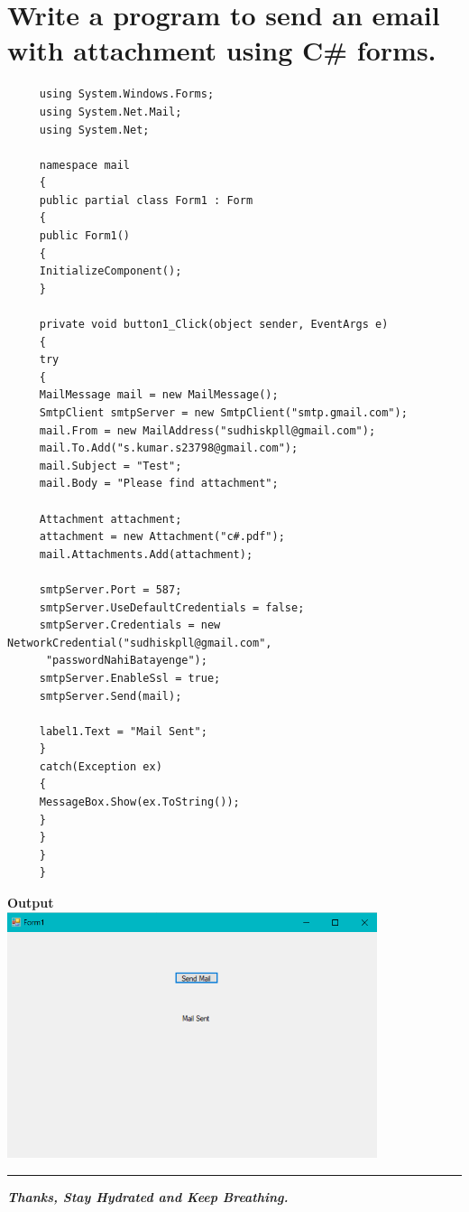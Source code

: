\documentclass[11pt,dvipsnames,cmyk]{article}
\begin{document}
	 \section*{Write a program to send an email with attachment using C\# forms.}
	 \begin{verbatim}
	 using System.Windows.Forms;
	 using System.Net.Mail;
	 using System.Net;
	 
	 namespace mail
	 {
	 public partial class Form1 : Form
	 {
	 public Form1()
	 {
	 InitializeComponent();
	 }
	 
	 private void button1_Click(object sender, EventArgs e)
	 {
	 try
	 {
	 MailMessage mail = new MailMessage();
	 SmtpClient smtpServer = new SmtpClient("smtp.gmail.com");
	 mail.From = new MailAddress("sudhiskpll@gmail.com");
	 mail.To.Add("s.kumar.s23798@gmail.com");
	 mail.Subject = "Test";
	 mail.Body = "Please find attachment";
	 
	 Attachment attachment;
	 attachment = new Attachment("c#.pdf");
	 mail.Attachments.Add(attachment);
	 
	 smtpServer.Port = 587;
	 smtpServer.UseDefaultCredentials = false;
	 smtpServer.Credentials = new NetworkCredential("sudhiskpll@gmail.com",
	  "passwordNahiBatayenge");
	 smtpServer.EnableSsl = true;
	 smtpServer.Send(mail);
	 
	 label1.Text = "Mail Sent";
	 }
	 catch(Exception ex)
	 {
	 MessageBox.Show(ex.ToString());
	 }
	 }
	 }
	 }
	 \end{verbatim}
	 \begin{center}
	 	\textbf{Output}\\
	 	\hfill\break\includegraphics[width=4.27in]{10.png}\\
	 	\hfill\break\rule{6.27in}{1.2pt}
	 	\hfill\break\textbf{\emph{Thanks, Stay Hydrated and Keep Breathing.}}
	 \end{center}
\end{document}

